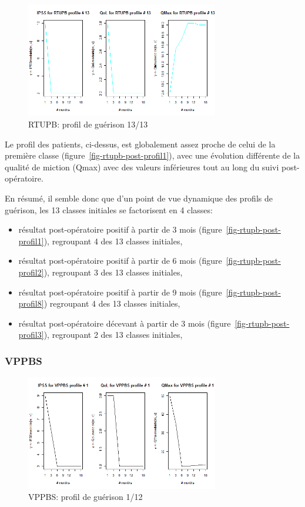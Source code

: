 \begin{figure}[H]
\centering
\includegraphics[width=0.75\textwidth]{../Fig/RTUPB/rtupb-profil-post-13.png}
\caption{RTUPB: profil de guérison 13/13}
\label{fig-rtupb-post-profil13}
\end{figure}

Le profil des patients, ci-dessus, est globalement assez proche de celui de la première classe (figure~\ref{fig-rtupb-post-profil1}), avec une évolution différente de la qualité de miction (Qmax) avec des valeurs inférieures tout au long du suivi post-opératoire.

En résumé, il semble donc que d'un point de vue dynamique des profils de guérison, les 13 classes initiales se factorisent en 4 classes:
\begin{itemize}
\item résultat post-opératoire positif à partir de 3 mois (figure~\ref{fig-rtupb-post-profil1}), regroupant 4 des 13 classes initiales,
\item résultat post-opératoire positif à partir de 6 mois (figure~\ref{fig-rtupb-post-profil2}), regroupant 3 des 13 classes initiales,
\item résultat post-opératoire positif à partir de 9 mois (figure~\ref{fig-rtupb-post-profil8}) regroupant 4 des 13 classes initiales,
\item résultat post-opératoire décevant à partir de 3 mois (figure~\ref{fig-rtupb-post-profil3}), regroupant 2 des 13 classes initiales,
\end{itemize}

%
\subsubsection{VPPBS}

\begin{figure}[H]
\centering
\includegraphics[width=0.75\textwidth]{../Fig/VPPBS/vppbs-profil-post-01.png}
\caption{VPPBS: profil de guérison 1/12}
\label{fig-vppbs-post-profil1}
\end{figure}

